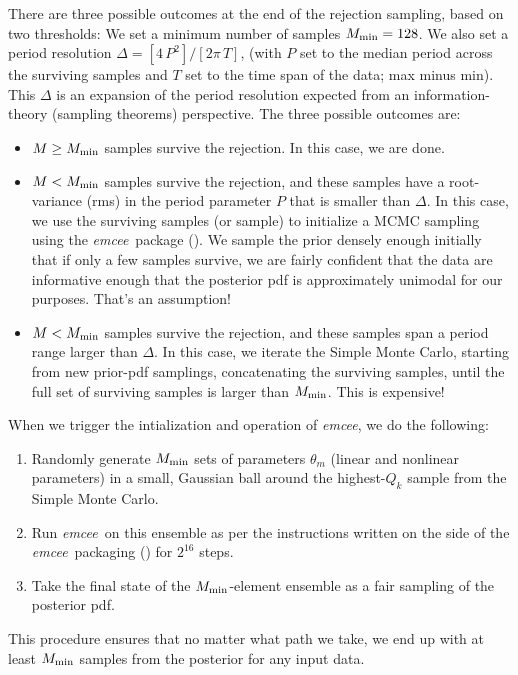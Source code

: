 \documentclass[manuscript, letterpaper]{aastex6}
\newcommand{\project}[1]{\textsl{#1}}
\newcommand{\emcee}{\project{emcee}}
\begin{document}
There are three possible outcomes at the end of the rejection
sampling, based on two thresholds:
We set a minimum number of samples $M_{\rm min}=128$.
We also set a period resolution $\Delta = [4\,P^2] / [2\pi\,T]$, (with
$P$ set to the median period across the surviving samples and $T$ set to
the time span of the data; max minus min).
This $\Delta$ is an expansion of the period
resolution expected from an information-theory (sampling theorems) perspective.
The three possible outcomes are:
\begin{itemize}
\item $M\geq M_{\rm min}$ samples survive the rejection.
  In this case, we are done.
\item $M<M_{\rm min}$ samples survive the rejection, and these samples
  have a root-variance (rms) in the period parameter $P$ that is
  smaller than $\Delta$.
  In this case, we use the surviving samples (or sample) to
  initialize a MCMC sampling using the \emcee\ package
  (\citealt{Foreman-Mackey:2013}).
  We sample the
  prior densely enough initially that if only a few samples survive,
  we are fairly confident that the data are informative enough that
  the posterior pdf is approximately unimodal for our purposes. That's
  an assumption!
\item $M<M_{\rm min}$ samples survive the rejection, and these samples
  span a period range larger than $\Delta$.
  In this case, we iterate the Simple
  Monte Carlo, starting from new prior-pdf samplings, concatenating
  the surviving samples, until the full set of surviving samples is
  larger than $M_{\rm min}$. This is expensive!
\end{itemize}
When we trigger the intialization and operation of \emcee, we do the following:
\begin{enumerate}
\item Randomly generate $M_{\rm min}$ sets of parameters $\theta_m$
  (linear and nonlinear parameters) in a small, Gaussian ball around
  the highest-$Q_k$ sample from the Simple Monte Carlo.
\item Run \emcee\ on this ensemble as per the instructions written on the side
  of the \emcee\ packaging (\citealt{Foreman-Mackey:2013}) for $2^{16}$ steps.
\item Take the final state of the $M_{\rm min}$-element ensemble as a
  fair sampling of the posterior pdf.
\end{enumerate}
This procedure ensures that no matter what path we take, we end up with
at least $M_{\rm min}$ samples from the posterior for any input data.
\end{document}
